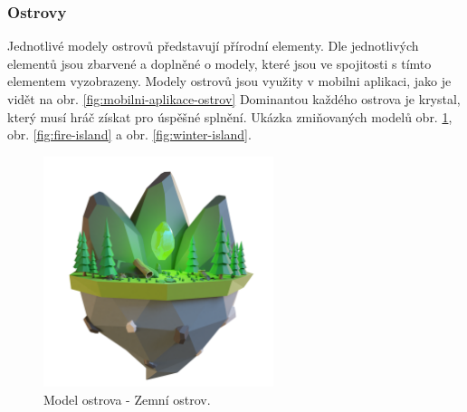 \subsubsection{Ostrovy}
Jednotlivé modely ostrovů představují přírodní elementy. Dle jednotlivých elementů jsou zbarvené a doplněné o modely, které jsou ve spojitosti s tímto elementem vyzobrazeny. Modely ostrovů jsou využity v mobilni aplikaci, jako je vidět na obr. \ref{fig:mobilni-aplikace-ostrov} Dominantou každého ostrova je krystal, který musí hráč získat pro úspěšné splnění. Ukázka zmiňovaných modelů obr. \ref{fig:nature-island}, obr. \ref{fig:fire-island} a obr. \ref{fig:winter-island}.

\begin{figure}[h]
    \centering
    \includegraphics[width=0.6\textwidth]{img/NatureIsland.png}
    \caption{Model ostrova - Zemní ostrov.}
    \label{fig:nature-island}
\end{figure}

